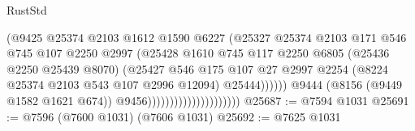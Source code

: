 \begin{lexlean}{RustStd}
\begin{coremodule}
{\begin{coremodule}
{{{{{{{{{{{{{{{{{{{{{{{{{{{{{{{{{{                                                  (@9425
                                                    @25374
                                                    @2103
                                                    @1612
                                                    @1590
                                                    @6227
                                                    (@25327
                                                      @25374
                                                      @2103
                                                      @171
                                                      @546
                                                      @745
                                                      @107
                                                      @2250
                                                      @2997
                                                      (@25428
                                                        @1610
                                                        @745
                                                        @117
                                                        @2250
                                                        @6805
                                                        (@25436 @2250 @25439 @8070)
                                                        (@25427
                                                          @546
                                                          @175
                                                          @107
                                                          @27
                                                          @2997
                                                          @2254
                                                          (@8224
                                                            @25374
                                                            @2103
                                                            @543
                                                            @107
                                                            @2996
                                                            @12094)
                                                          @25444))))))
                                              @9444
                                              (@8156 (@9449 @1582 @1621 @674))
                                              @9456)))))))))))))))))))))
@25687 := @7594 @1031
@25691 := @7596 (@7600 @1031) (@7606 @1031)
@25692 := @7625 @1031
}}}}}}}}}}}}}}}}}}}}}}}}}}}}}}}}}}
\end{coremodule}}
\end{coremodule}
\end{lexlean}
